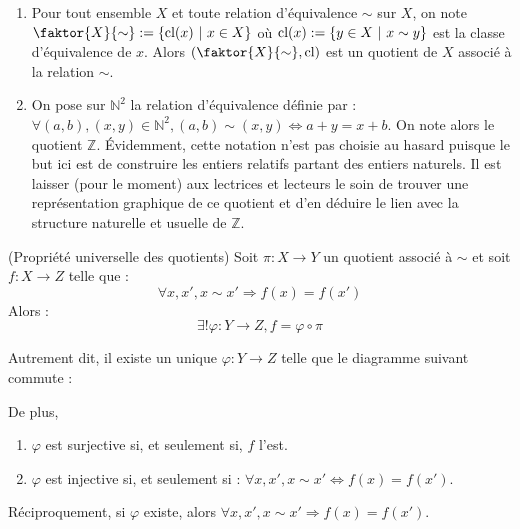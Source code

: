 \begin{example}
  \blank
  \begin{enumerate}
    \item Pour tout ensemble $X$ et toute relation d'équivalence $\sim$ sur $X$, on note $\faktor{X}{\sim} := \{ 
      \textup{cl}(x) ~|~ x \in X \}$ où $\textup{cl}(x) := \{ y \in X ~|~ x \sim y \}$ est la classe 
      d'équivalence de $x$. Alors $(\faktor{X}{\sim}, \textup{cl})$ est un quotient de $X$ associé à la relation $\sim$.
    \item On pose sur $\mathbb{N}^{2}$ la relation d'équivalence définie par : $\forall (a,b), (x,y) \in \mathbb{N}^{2}, 
      (a,b) \sim (x,y) \Leftrightarrow a+y = x + b$. On note alors le quotient $\mathbb{Z}$. Évidemment, cette notation
      n'est pas choisie au hasard puisque le but ici est de construire les entiers relatifs partant des entiers naturels.
      Il est laisser (pour le moment) aux lectrices et lecteurs le soin de trouver une représentation graphique de 
      ce quotient et d'en déduire le lien avec la structure naturelle et usuelle de $\mathbb{Z}$.
  \end{enumerate}
\end{example}   

\begin{theorem}{(Propriété universelle des quotients)}
    \label{thm:ppuquotient}
    Soit $\pi : X \to Y$ un quotient associé à $\sim$ et soit $f :  X \to Z$ telle que : 
    \[
      \forall x,x', x \sim x' \Rightarrow f(x)=f(x')
    \]
    Alors : 
    \[
      \exists ! \varphi : Y \to Z, f = \varphi \circ \pi
    \]

    Autrement dit, il existe un unique $\varphi : Y \to Z$ telle que le diagramme suivant commute : 
    \begin{center}
    \end{center}

    De plus, 

    \begin{enumerate}
      \item $\varphi$ est surjective si, et seulement si, $f$ l'est.
      \item $\varphi$ est injective si, et seulement si : $\forall x,x', x \sim x' \Leftrightarrow f(x) =f(x')$.
    \end{enumerate}

    Réciproquement, si $\varphi$ existe, alors $\forall x,x', x \sim x' \Rightarrow f(x) = f(x')$.
\end{theorem}

